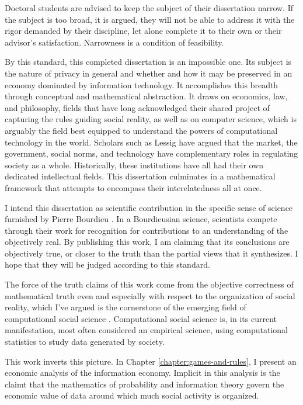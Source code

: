 \documentclass[../thesis.tex]{subfiles}
\begin{document}
 Doctoral students are advised to keep the subject of their
 dissertation narrow.
 If the subject is too broad, it is argued, they will not be
 able to address it with the rigor demanded by their discipline,
 let alone complete it to their own or their advisor's satisfaction.
 Narrowness is a condition of feasibility.

 By this standard, this completed dissertation is an impossible
 one.
 Its subject is the nature of privacy in general and whether and how it may be preserved in an economy dominated by information technology.
 It accomplishes this breadth through conceptual and mathematical
 abstraction.
 It draws on economics, law, and philosophy, fields that have long acknowledged their shared project of capturing the rules guiding social reality, as well as on computer science, which is arguably the field best equipped to understand the powers of computational technology in the world.
 Scholars such as Lessig \cite{lessig1999code} have argued that the market, the government, social norms, and technology have complementary roles in regulating society as a whole.
 Historically, these institutions have all had their own dedicated intellectual fields.
 This dissertation culminates in a mathematical framework that attempts to encompass their interelatedness all at once.

 I intend this dissertation as scientific contribution
 in the specific sense of science furnished by Pierre Bourdieu
 \cite{bourdieu2004science}.
 In a Bourdieusian science, scientists compete through their work
 for recognition for contributions to an understanding of the
 objectively real.
 By publishing this work, I am claiming that its conclusions
 are objectively true, or closer to the truth than the partial
 views that it synthesizes.
 I hope that they will be judged according to this standard.

 The force of the truth claims of this work come from the
 objective correctness of mathematical truth even and especially
 with respect to the organization of social reality, which I've
 argued is the cornerstone of the emerging field of
 computational social science \cite{benthall2016philosophy}.
 Computational social science is, in its current manifestation,
 most often considered an empirical science, using computational
 statistics to study data generated by society.

 This work inverts this picture.
 In Chapter \ref{chapter:games-and-rules}, I present
 an economic analysis of the information economy.
 Implicit in this analysis is the claimt that
 the mathematics of probability and information theory
 govern the economic value of data around which much
 social activity is organized.
\end{document}

